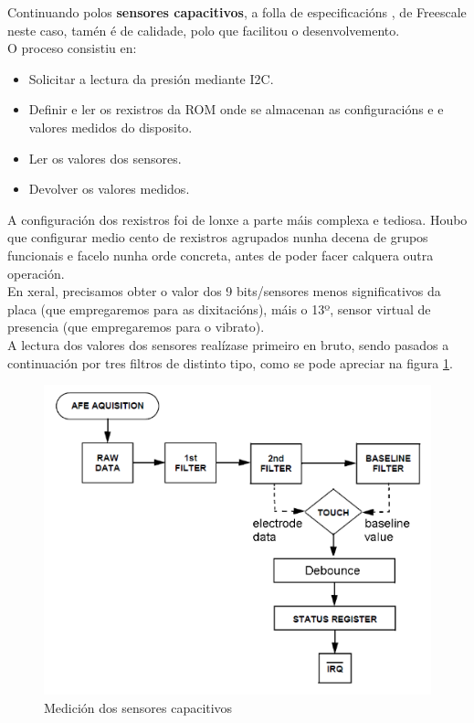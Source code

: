   Continuando polos \textbf{sensores capacitivos}, a folla de especificacións
   \cite{MPR121}, de Freescale neste caso, tamén é de calidade, polo que
   facilitou o desenvolvemento. \\
   
   O proceso consistiu en:
    
    \begin{itemize}
    \item Solicitar a lectura da presión mediante I2C.
    \item Definir e ler os rexistros da ROM onde se almacenan as configuracións
        e e valores medidos do disposito.
    \item Ler os valores dos sensores.
    \item Devolver os valores medidos.
   \end{itemize}
   
   A configuración dos rexistros foi de lonxe a parte máis complexa e tediosa.
   Houbo que configurar medio cento de rexistros agrupados nunha decena de
   grupos funcionais e facelo nunha orde concreta, antes de poder facer calquera
   outra operación. \\
   
   En xeral, precisamos obter o valor dos 9 bits/sensores menos significativos
   da placa (que empregaremos para as dixitacións), máis o 13º, sensor virtual
   de presencia (que empregaremos para o vibrato). \\
   
   A lectura dos valores dos sensores realízase primeiro en bruto, sendo pasados
   a continuación por tres filtros de distinto tipo, como se pode apreciar na
   figura \ref{figura:Mpr121Medicion}. \\
   
   \begin{figure}[htbp]
    \centering
    \includegraphics[scale=0.6, keepaspectratio=true]{./imagenes/mpr121-medicion.png}
    \caption{Medición dos sensores capacitivos}
    \label{figura:Mpr121Medicion}
   \end{figure}
   
